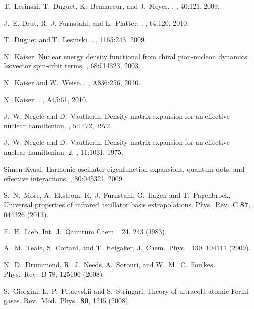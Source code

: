 \begin{thebibliography}{200}
T.~Lesinski, T.~Duguet, K.~Bennaceur, and J.~Meyer.
.
, 40:121, 2009.

J.~E. Drut, R.~J. Furnstahl, and L.~Platter.
.
, 64:120, 2010.

T.~Duguet and T.~Lesinski.
.
, 1165:243, 2009.


N.~Kaiser.
\newblock Nuclear energy density functional from chiral pion-nucleon dynamics:
  Isovector spin-orbit terms.
, 68:014323, 2003.

N.~Kaiser and W.~Weise.
.
, A836:256, 2010.

N.~Kaiser.
.
, A45:61, 2010.


J.~W. Negele and D.~Vautherin.
\newblock Density-matrix expansion for an effective nuclear hamiltonian.
, 5:1472, 1972.

J.~W. Negele and D.~Vautherin.
\newblock Density-matrix expansion for an effective nuclear hamiltonian. 2.
, 11:1031, 1975.


Simen Kvaal.
\newblock Harmonic oscillator eigenfunction expansions, quantum dots, and
  effective interactions.
, 80:045321, 2009.

 S.~N.~More, A.~Ekstrom, R.~J.~Furnstahl, G.~Hagen and T.~Papenbrock,
 \newblock Universal properties of infrared oscillator basis extrapolations.
 \newblock Phys.\ Rev.\ C {\bf 87}, 044326 (2013).



 E.~H.~Lieb, Int.~J.~Qauntum Chem.~{ 24}, 243 (1983).


 A.~M.~Teale, S.~Coriani, and T.~Helgaker, J.~Chem.~Phys.~{ 130}, 104111 (2009).

 N.~D.~Drummond, R.~J.~Needs, A.~Sorouri, and W.~M.~C.~Foulkes, Phys.~Rev.~B { 78}, 125106 (2008). 

  S.~Giorgini, L.~P.~Pitaevskii and S.~Stringari,
\newblock Theory of ultracold atomic Fermi gases.
\newblock  Rev.\ Mod.\ Phys.\  {\bf 80}, 1215 (2008).
\end{thebibliography}





